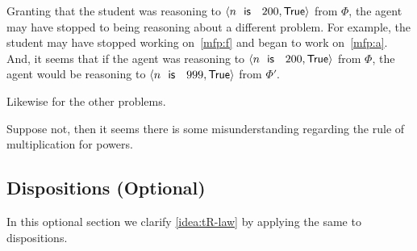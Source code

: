 \begin{note}
\begin{illustration}
    Granting that the student was reasoning to \(\pv{n\propI{ is }200}{\valI{True}}\) from \(\Phi\), the agent may have stopped to being reasoning about a different problem.
    For example, the student may have stopped working on~\ref{mfp:f} and began to work on~\ref{mfp:a}.
    And, it seems that if the agent was reasoning to \(\pv{n\propI{ is }200}{\valI{True}}\) from \(\Phi\), the agent would be reasoning to \(\pv{n\propI{ is }999}{\valI{True}}\) from \(\Phi'\).

    Likewise for the other problems.
  \end{illustration}

  Suppose not, then it seems there is some misunderstanding regarding the rule of multiplication for powers.
\end{note}

\subsection[Dispositions]{Dispositions \hfill (Optional)}
\label{sec:dispositions}

\begin{note}
  In this optional section we clarify \autoref{idea:tR-law} by applying the same to dispositions.
\end{note}



